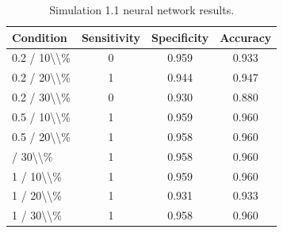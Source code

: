 \begin{table}[!h]
\centering
\caption{\label{tab:tab:sim11_nn}Simulation 1.1 neural network results.}
\centering
\begin{tabular}[t]{lccc}
\toprule
Condition & Sensitivity & Specificity & Accuracy\\
\midrule
0.2 / 10\textbackslash{}\textbackslash{}\% & 0 & 0.959 & 0.933\\
0.2 / 20\textbackslash{}\textbackslash{}\% & 1 & 0.944 & 0.947\\
0.2 / 30\textbackslash{}\textbackslash{}\% & 0 & 0.930 & 0.880\\
0.5 / 10\textbackslash{}\textbackslash{}\% & 1 & 0.959 & 0.960\\
0.5 / 20\textbackslash{}\textbackslash{}\% & 1 & 0.958 & 0.960\\
\addlinespace
0.5 / 30\textbackslash{}\textbackslash{}\% & 1 & 0.958 & 0.960\\
1 / 10\textbackslash{}\textbackslash{}\% & 1 & 0.959 & 0.960\\
1 / 20\textbackslash{}\textbackslash{}\% & 1 & 0.931 & 0.933\\
1 / 30\textbackslash{}\textbackslash{}\% & 1 & 0.958 & 0.960\\
\bottomrule
\end{tabular}
\end{table}
